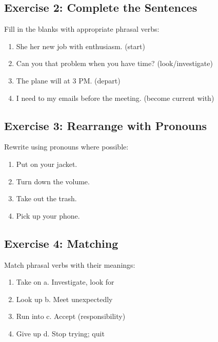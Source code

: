 \subsection{Exercise 2: Complete the Sentences}
Fill in the blanks with appropriate phrasal verbs:

\begin{enumerate}
    \item She \underline{\hspace{3cm}} her new job with enthusiasm. (start)
    \item Can you \underline{\hspace{3cm}} that problem when you have time? (look/investigate)
    \item The plane will \underline{\hspace{3cm}} at 3 PM. (depart)
    \item I need to \underline{\hspace{3cm}} my emails before the meeting. (become current with)
\end{enumerate}

\subsection{Exercise 3: Rearrange with Pronouns}
Rewrite using pronouns where possible:

\begin{enumerate}
    \item Put on your jacket. \underline{\hspace{4cm}}
    \item Turn down the volume. \underline{\hspace{4cm}}
    \item Take out the trash. \underline{\hspace{4cm}}
    \item Pick up your phone. \underline{\hspace{4cm}}
\end{enumerate}

\subsection{Exercise 4: Matching}
Match phrasal verbs with their meanings:

\begin{enumerate}
    \item Take on \hspace{3cm} a. Investigate, look for
    \item Look up \hspace{3cm} b. Meet unexpectedly
    \item Run into \hspace{3cm} c. Accept (responsibility)
    \item Give up \hspace{3cm} d. Stop trying; quit
\end{enumerate}

